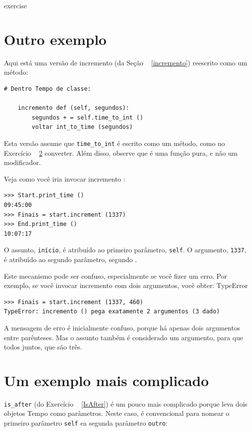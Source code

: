 \documentclass[10pt]{book}
\begin{document}
\begin{exercise}
\begin{v erbatim}
{\begin{}
\end{} exercise


\section{Outro exemplo}

Aqui está uma versão de incremento {\tt} (da Seção ~ \ref {incremento})
reescrito como um método:

\begin{verbatim}
# Dentro Tempo de classe:

    incremento def (self, segundos):
        segundos + = self.time_to_int ()
        voltar int_to_time (segundos)
\end{verbatim}
%
Esta versão assume que \verb "time_to_int" é escrito
como um método, como no Exercício ~ \ref {} converter. Além disso, observe que
é uma função pura, e não um modificador.

Veja como você iria invocar {incremento \tt}:

\begin{verbatim}
>>> Start.print_time ()
09:45:00
>>> Finais = start.increment (1337)
>>> End.print_time ()
10:07:17
\end{verbatim}
%
O assunto, {\tt início}, é atribuído ao primeiro parâmetro,
{\tt self}. O argumento, {\tt 1337}, é atribuído ao
segundo parâmetro, segundo {\tt}.

Este mecanismo pode ser confuso, especialmente se você fizer um erro.
Por exemplo, se você invocar {incremento \tt} com dois argumentos, você
obter:
\index{} TypeError

\begin{verbatim}
>>> Finais = start.increment (1337, 460)
TypeError: incremento () pega exatamente 2 argumentos (3 dado)
\end{verbatim}
%
A mensagem de erro é inicialmente confuso, porque há
apenas dois argumentos entre parênteses. Mas o assunto também é
considerado um argumento, para que todos juntos, que são três.


\section{Um exemplo mais complicado}

\Verb "is_after" (do Exercício ~ \ref {IsAfter}) é um pouco mais complicado
porque leva dois objetos Tempo como parâmetros. Neste caso, é
convencional para nomear o primeiro parâmetro {\tt self} ea segunda
parâmetro {\tt outro}:

}
\end{v erbatim}
\end{exercise}
\end{document}

